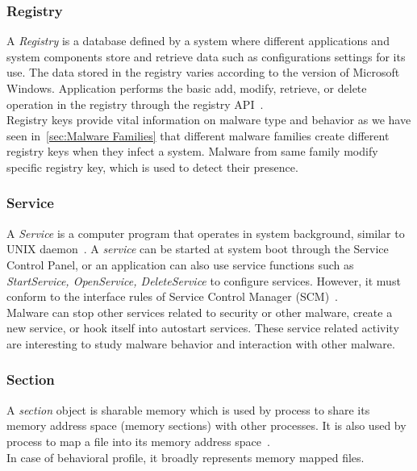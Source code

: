 \subsubsection{Registry}
\label{ssub:Registry}
A \emph{Registry} is a database defined by a system where different applications and system components store and retrieve data such as configurations settings for its use.
The data stored in the registry varies according to the version of Microsoft Windows.
Application performs the basic add, modify, retrieve, or delete operation in the registry through the registry API~\cite[]{msregistry}.\\
Registry keys provide vital information on malware type and behavior as we have seen in~\autoref{sec:Malware Families} that different malware families create different registry keys when they infect a system.
Malware from same family modify specific registry key, which is used to detect their presence.
\subsubsection{Service}
\label{ssub:Service}
A \emph{Service} is a computer program that operates in system background, similar to UNIX daemon~\cite[]{servicedef}.
A \emph{service} can be started at system boot through the Service Control Panel, or an application can also use service functions such as \emph{StartService, OpenService, DeleteService} to configure services.
However, it must conform to the interface rules of Service Control Manager (SCM)~\cite[]{msservice}.\\
Malware can stop other services related to security or other malware, create a new service, or hook itself into autostart services.
These service related activity are interesting to study malware behavior and interaction with other malware.
\subsubsection{Section}
\label{ssub:Section}
A \emph{section} object is sharable memory which is used by process to share its memory address space (memory sections) with other processes.
It is also used by process to map a file into its memory address space~\cite[]{mssection}.\\
In case of behavioral profile, it broadly represents memory mapped files.
